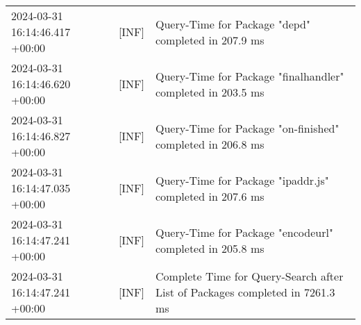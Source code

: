 {{\begin{tabularx}{\textwidth}{|l|l|X|}
                    2024-03-31 16:14:46.417 +00:00 & [INF] & Query-Time for Package "depd" completed in 207.9 ms \\
                    2024-03-31 16:14:46.620 +00:00 & [INF] & Query-Time for Package "finalhandler" completed in 203.5 ms \\
                    2024-03-31 16:14:46.827 +00:00 & [INF] & Query-Time for Package "on-finished" completed in 206.8 ms \\
                    2024-03-31 16:14:47.035 +00:00 & [INF] & Query-Time for Package "ipaddr.js" completed in 207.6 ms \\
                    2024-03-31 16:14:47.241 +00:00 & [INF] & Query-Time for Package "encodeurl" completed in 205.8 ms \\
                    2024-03-31 16:14:47.241 +00:00 & [INF] & Complete Time for Query-Search after List of Packages completed in 7261.3 ms \\
                    \hline
                \end{tabularx}
            }
        }

